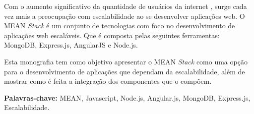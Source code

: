 	
	Com o aumento significativo da quantidade de usuários da internet \cite{intStats}, surge cada vez mais a preocupação com escalabilidade ao se desenvolver aplicações web. O MEAN \textit{Stack} é um conjunto de tecnologias com foco no desenvolvimento de aplicações web escaláveis. Que é composta pelas seguintes ferramentas: MongoDB, Express.js, AngularJS e Node.js.

Esta monografia tem como objetivo apresentar o MEAN \textit{Stack} como uma opção para o desenvolvimento de aplicações que dependam da escalabilidade, além de mostrar como é feita a integração dos componentes que o compõem. 
	
\textbf{Palavras-chave:} MEAN, Javascript, Node.js, Angular.js, MongoDB, Express.js, Escalabilidade.